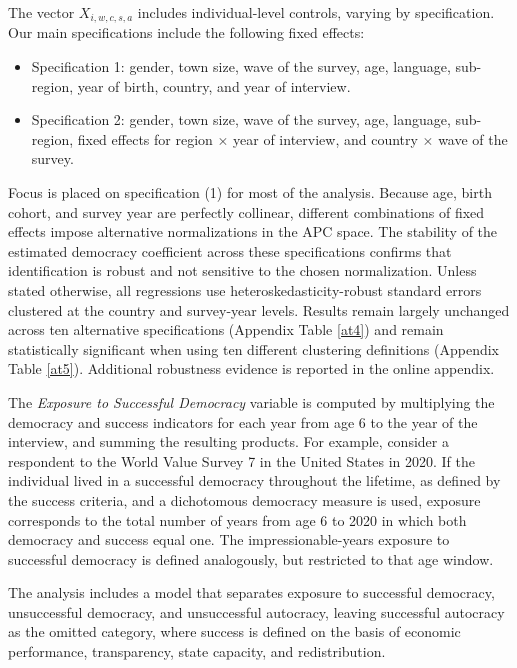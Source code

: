 \documentclass[11pt]{article}
\begin{document}
The vector $X_{i,w,c,s,a}$ includes individual-level controls, varying by specification. Our main specifications include the following fixed effects:
\begin{itemize}
	\item Specification 1: gender, town size, wave of the survey, age, language, sub-region, year of birth, country, and year of interview.
	\item Specification 2: gender, town size, wave of the survey, age, language, sub-region, fixed effects for region $\times$ year of interview, and country $\times$ wave of the survey.
\end{itemize}

Focus is placed on specification (1) for most of the analysis. Because age, birth cohort, and survey year are perfectly collinear, different combinations of fixed effects impose alternative normalizations in the APC space. The stability of the estimated democracy coefficient across these specifications confirms that identification is robust and not sensitive to the chosen normalization. Unless stated otherwise, all regressions use heteroskedasticity-robust standard errors clustered at the country and survey-year levels. Results remain largely unchanged across ten alternative specifications (Appendix Table \ref{at4}) and remain statistically significant when using ten different clustering definitions (Appendix Table \ref{at5}). Additional robustness evidence is reported in the online appendix. 

The \textit{Exposure to Successful Democracy} variable is computed by multiplying the democracy and success indicators for each year from age 6 to the year of the interview, and summing the resulting products. For example, consider a respondent to the World Value Survey 7 in the United States in 2020. If the individual lived in a successful democracy throughout the lifetime, as defined by the success criteria, and a dichotomous democracy measure is used, exposure corresponds to the total number of years from age 6 to 2020 in which both democracy and success equal one. The impressionable-years exposure to successful democracy is defined analogously, but restricted to that age window.

The analysis includes a model that separates exposure to successful democracy, unsuccessful democracy, and unsuccessful autocracy, leaving successful autocracy as the omitted category, where success is defined on the basis of economic performance, transparency, state capacity, and redistribution.
\end{document}
